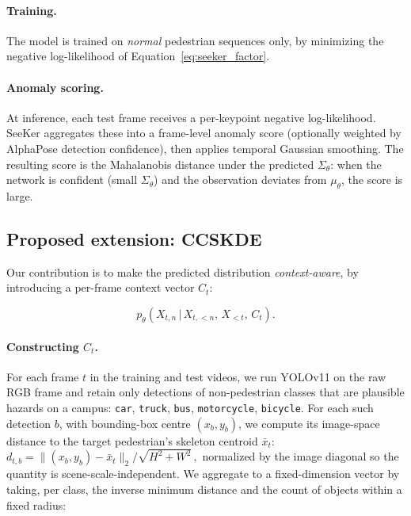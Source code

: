 \documentclass{article}
\begin{document}
\paragraph{Training.} The model is trained on \emph{normal} pedestrian
sequences only, by minimizing the negative log-likelihood of
Equation~\ref{eq:seeker_factor}.

\paragraph{Anomaly scoring.} At inference, each test frame receives a
per-keypoint negative log-likelihood. SeeKer aggregates these into a
frame-level anomaly score (optionally weighted by AlphaPose detection
confidence), then applies temporal Gaussian smoothing.
The resulting score is the Mahalanobis distance under the predicted
$\Sigma_{\theta}$: when the network is confident (small $\Sigma_{\theta}$)
and the observation deviates from $\mu_{\theta}$, the score is large.

\subsection{Proposed extension: CCSKDE}
\label{ssec:ccskde}

Our contribution is to make the predicted distribution
\emph{context-aware}, by introducing a per-frame context vector $C_t$:

\begin{equation}
\label{eq:ccskde_factor}
p_{\theta}\!\left(X_{t,n}\,\big|\, X_{t,<n},\, X_{<t},\, C_t\right).
\end{equation}

\paragraph{Constructing $C_t$.}
For each frame $t$ in the training and test videos, we run YOLOv11 on the raw
RGB frame and retain only detections of non-pedestrian classes that are
plausible hazards on a campus: \texttt{car}, \texttt{truck}, \texttt{bus},
\texttt{motorcycle}, \texttt{bicycle}. For each such detection $b$, with
bounding-box centre $(x_b, y_b)$, we compute its image-space distance to the
target pedestrian's skeleton centroid $\bar{x}_t$:
\(
d_{t,b} = \lVert (x_b, y_b) - \bar{x}_t \rVert_2 / \sqrt{H^2 + W^2}\,,
\)
normalized by the image diagonal so the quantity is scene-scale-independent.
We aggregate to a fixed-dimension vector by taking, per class,
the inverse minimum distance and the count of objects within a fixed radius:
\end{document}

